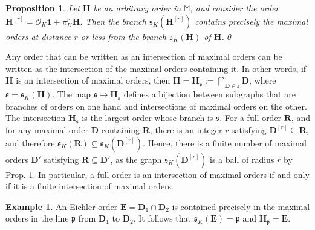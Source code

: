 \documentclass{amsart}
\newtheorem{proposition}[theorem]{Proposition}
\theoremstyle{definition}
\newtheorem{example}[theorem]{Example}
\newcommand\alge{\mathbb{M}}
\newcommand\oink{\mathcal O}
\newcommand\Ra{\mathbf R}
\newcommand\Da{\mathbf{D}}
\newcommand\Ha{\mathbf{H}}
\newcommand\Ea{\mathbf{E}}
\begin{document}
\begin{proposition}\label{p21}
    Let $\Ha$ be an arbitrary order in $\alge$, and consider
    the order $\Ha^{[r]}=\oink_K\mathbf{1}+\pi_K^r\Ha$. 
    Then the branch
    $\mathfrak{s}_K\left(\Ha^{[r]}\right)$ contains precisely
    the maximal orders at distance $r$ or less from the
    branch $\mathfrak{s}_K(\Ha)$ 
    of $\Ha$.\qed
\end{proposition}

Any order that can be written as an intersection of maximal orders can be written as the intersection of
the maximal orders containing it. In other words, if
$\Ha$ is an intersection of maximal orders, then
$\Ha=\Ha_{\mathfrak{s}}:=
\bigcap_{\Da\in\mathfrak{s}}\Da$, where
$\mathfrak{s}=\mathfrak{s}_K(\Ha)$. The map
$\mathfrak{s}\mapsto\Ha_{\mathfrak{s}}$
defines a bijection between subgraphs that
are branches of orders on one hand and intersections
of maximal orders on the other. The intersection
$\Ha_{\mathfrak{s}}$ is the largest order whose branch
is $\mathfrak{s}$. For a full order $\Ra$, and for any
maximal order $\Da$ containing $\Ra$, there is an integer
$r$ satisfying $\Da^{[r]}\subseteq \Ra$, and therefore
$\mathfrak{s}_K(\Ra)\subseteq
\mathfrak{s}_K\left(\Da^{[r]}\right)$.
Hence, there is a finite
number of maximal orders $\Da'$ satisfying $\Ra\subseteq\Da'$,
as the graph $\mathfrak{s}_K\left(\Da^{[r]}\right)$ is a ball
of radius $r$ by Prop. \ref{p21}.
In particular, a full order is an intersection of maximal
orders if and only if it is a finite intersection of
maximal orders.

\begin{example}
    An Eichler order $\Ea=\Da_1\cap\Da_2$ is contained precisely
    in the maximal orders in the line $\mathfrak{p}$
    from $\Da_1$ to $\Da_2$. It follows that
    $\mathfrak{s}_K(\Ea)=\mathfrak{p}$ and 
    $\Ha_\mathfrak{p}=\Ea$.
\end{example}
\end{document}
